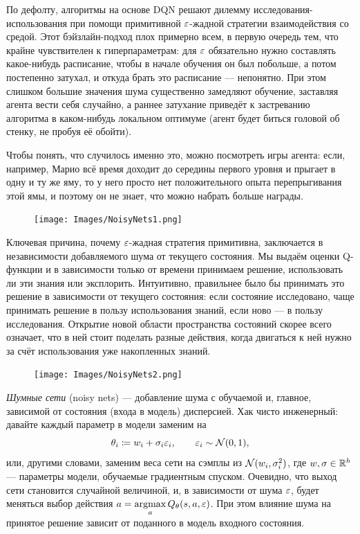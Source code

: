 По дефолту, алгоритмы на основе DQN решают дилемму исследования-использования при помощи примитивной $\varepsilon$-жадной стратегии взаимодействия со средой. Этот бэйзлайн-подход плох примерно всем, в первую очередь тем, что крайне чувствителен к гиперпараметрам: для $\varepsilon$ обязательно нужно составлять какое-нибудь расписание, чтобы в начале обучения он был побольше, а потом постепенно затухал, и откуда брать это расписание --- непонятно. При этом слишком большие значения шума существенно замедляют обучение, заставляя агента вести себя случайно, а раннее затухание приведёт к застреванию алгоритма в каком-нибудь локальном оптимуме (агент будет биться головой об стенку, не пробуя её обойти). 
\begin{remark}
Чтобы понять, что случилось именно это, можно посмотреть игры агента: если, например, Марио всё время доходит до середины первого уровня и прыгает в одну и ту же яму, то у него просто нет положительного опыта перепрыгивания этой ямы, и поэтому он не знает, что можно набрать больше награды.
\end{remark}

\begin{figure}
\vspace{-0.3cm}
\centering
\texttt{[image: Images/NoisyNets1.png]}
\vspace{-0.3cm}
\end{figure}

Ключевая причина, почему $\varepsilon$-жадная стратегия примитивна, заключается в независимости добавляемого шума от текущего состояния. Мы выдаём оценки Q-функции и в зависимости только от времени принимаем решение, использовать ли эти знания или эксплорить. Интуитивно, правильнее было бы принимать это решение в зависимости от текущего состояния: если состояние исследовано, чаще принимать решение в пользу использования знаний, если ново --- в пользу исследования. Открытие новой области пространства состояний скорее всего означает, что в ней стоит поделать разные действия, когда двигаться к ней нужно за счёт использования уже накопленных знаний.

\begin{figure}
\vspace{-0.3cm}
\centering
\texttt{[image: Images/NoisyNets2.png]}
\vspace{-0.3cm}
\end{figure}

\emph{Шумные сети} (noisy nets) --- добавление шума с обучаемой и, главное, зависимой от состояния (входа в модель) дисперсией. Хак чисто инженерный: давайте каждый параметр в модели заменим на
$$\theta_i \coloneqq w_i + \sigma_i \varepsilon_i, \qquad \varepsilon_i \sim \mathcal{N}(0, 1),$$
или, другими словами, заменим веса сети на сэмплы из $\mathcal{N}(w_i, \sigma^2_i)$, где $w, \sigma \in \mathbb{R}^h$ --- параметры модели, обучаемые градиентным спуском. Очевидно, что выход сети становится случайной величиной, и, в зависимости от шума $\varepsilon$, будет меняться выбор действия $a \HM= \argmax\limits_a Q_{\theta}(s, a, \eps)$. При этом влияние шума на принятое решение зависит от поданного в модель входного состояния.

